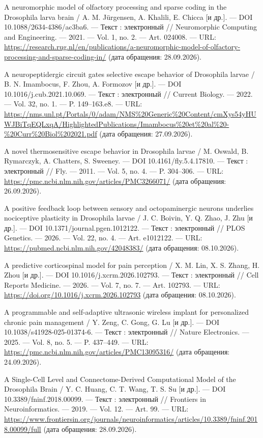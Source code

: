 \begin{list}{}{\setlength{\leftmargin}{10mm}\setlength{\labelwidth}{8mm}\setlength{\labelsep}{2mm}\setlength{\itemsep}{0pt}\setlength{\parsep}{0pt}\setlength{\topsep}{0pt}}
\item[14.] A neuromorphic model of olfactory processing and sparse coding in the Drosophila larva brain / A. M. Jürgensen, A. Khalili, E. Chicca [и др.]. — DOI 10.1088/2634-4386/ac3ba6. — Текст : электронный // Neuromorphic Computing and Engineering. — 2021. — Vol. 1, no. 2. — Art. 024008. — URL: \url{https://research.rug.nl/en/publications/a-neuromorphic-model-of-olfactory-processing-and-sparse-coding-in/} (дата обращения: 28.09.2026).
\item[15.] A neuropeptidergic circuit gates selective escape behavior of Drosophila larvae / B. N. Imambocus, F. Zhou, A. Formozov [и др.]. — DOI 10.1016/j.cub.2021.10.069. — Текст : электронный // Current Biology. — 2022. — Vol. 32, no. 1. — P. 149–163.e8. — URL: \url{https://nms.unl.pt/Portals/0/adam/NMS\%20Generic\%20Content/cmXys54yHUWJBiTqEQLxqA/HighlightedPublications/Imambocus\%20et\%20al\%20-\%20Curr\%20Biol\%202021.pdf} (дата обращения: 27.09.2026).
\item[16.] A novel thermosensitive escape behavior in Drosophila larvae / M. Oswald, B. Rymarczyk, A. Chatters, S. Sweeney. — DOI 10.4161/fly.5.4.17810. — Текст : электронный // Fly. — 2011. — Vol. 5, no. 4. — P. 304–306. — URL: \url{https://pmc.ncbi.nlm.nih.gov/articles/PMC3266071/} (дата обращения: 26.09.2026).
\item[17.] A positive feedback loop between sensory and octopaminergic neurons underlies nociceptive plasticity in Drosophila larvae / J. C. Boivin, Y. Q. Zhao, J. Zhu [и др.]. — DOI 10.1371/journal.pgen.1012122. — Текст : электронный // PLOS Genetics. — 2026. — Vol. 22, no. 4. — Art. e1012122. — URL: \url{https://pubmed.ncbi.nlm.nih.gov/42048383/} (дата обращения: 08.10.2026).
\item[18.] A predictive corticospinal model for pain perception / X. M. Lin, X. S. Zhang, H. Zhou [и др.]. — DOI 10.1016/j.xcrm.2026.102793. — Текст : электронный // Cell Reports Medicine. — 2026. — Vol. 7, no. 7. — Art. 102793. — URL: \url{https://doi.org/10.1016/j.xcrm.2026.102793} (дата обращения: 08.10.2026).
\item[19.] A programmable and self-adaptive ultrasonic wireless implant for personalized chronic pain management / Y. Zeng, C. Gong, G. Lu [и др.]. — DOI 10.1038/s41928-025-01374-6. — Текст : электронный // Nature Electronics. — 2025. — Vol. 8, no. 5. — P. 437–449. — URL: \url{https://pmc.ncbi.nlm.nih.gov/articles/PMC13095316/} (дата обращения: 24.09.2026).
\item[20.] A Single-Cell Level and Connectome-Derived Computational Model of the Drosophila Brain / Y. C. Huang, C. T. Wang, T. S. Su [и др.]. — DOI 10.3389/fninf.2018.00099. — Текст : электронный // Frontiers in Neuroinformatics. — 2019. — Vol. 12. — Art. 99. — URL: \url{https://www.frontiersin.org/journals/neuroinformatics/articles/10.3389/fninf.2018.00099/full} (дата обращения: 28.09.2026).

\end{list}
